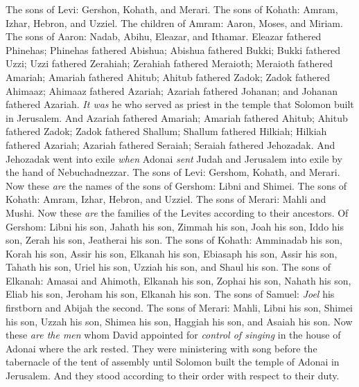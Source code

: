 \begin{biblechapter} %
\verse  The sons of Levi: Gershon, Kohath, and Merari.
\verse The sons of Kohath: Amram, Izhar, Hebron, and Uzziel.
\verse The children of Amram: Aaron, Moses, and Miriam. The sons of Aaron: Nadab, Abihu, Eleazar, and Ithamar.
\verse Eleazar fathered Phinehas; Phinehas fathered Abishua;
\verse Abishua fathered Bukki; Bukki fathered Uzzi;
\verse Uzzi fathered Zerahiah; Zerahiah fathered Meraioth;
\verse Meraioth fathered Amariah; Amariah fathered Ahitub;
\verse Ahitub fathered Zadok; Zadok fathered Ahimaaz;
\verse Ahimaaz fathered Azariah; Azariah fathered Johanan;
\verse and Johanan fathered Azariah. \textit{It was} he who served as priest in the temple that Solomon built in Jerusalem.
\verse And Azariah fathered Amariah; Amariah fathered Ahitub;
\verse Ahitub fathered Zadok; Zadok fathered Shallum;
\verse Shallum fathered Hilkiah; Hilkiah fathered Azariah;
\verse Azariah fathered Seraiah; Seraiah fathered Jehozadak.
\verse And Jehozadak went into exile \textit{when} Adonai \textit{sent} Judah and Jerusalem into exile by the hand of Nebuchadnezzar.
 The sons of Levi: Gershom, Kohath, and Merari.
\verse Now these \textit{are} the names of the sons of Gershom: Libni and Shimei.
\verse The sons of Kohath: Amram, Izhar, Hebron, and Uzziel.
\verse The sons of Merari: Mahli and Mushi. Now these \textit{are} the families of the Levites according to their ancestors.
\verse Of Gershom: Libni his son, Jahath his son, Zimmah his son,
\verse Joah his son, Iddo his son, Zerah his son, Jeatherai his son.
\verse The sons of Kohath: Amminadab his son, Korah his son, Assir his son,
\verse Elkanah his son, Ebiasaph his son, Assir his son,
\verse Tahath his son, Uriel his son, Uzziah his son, and Shaul his son.
\verse The sons of Elkanah: Amasai and Ahimoth,
\verse Elkanah his son, Zophai his son, Nahath his son,
\verse Eliab his son, Jeroham his son, Elkanah his son.
\verse The sons of Samuel: \textit{Joel} his firstborn and Abijah the second.
\verse The sons of Merari: Mahli, Libni his son, Shimei his son, Uzzah his son,
\verse Shimea his son, Haggiah his son, and Asaiah his son.
 Now these \textit{are the men} whom David appointed for \textit{control of singing} in the house of Adonai where the ark rested.
\verse They were ministering with song before the tabernacle of the tent of assembly until Solomon built the temple of Adonai in Jerusalem. And they stood according to their order with respect to their duty.

\end{biblechapter}

